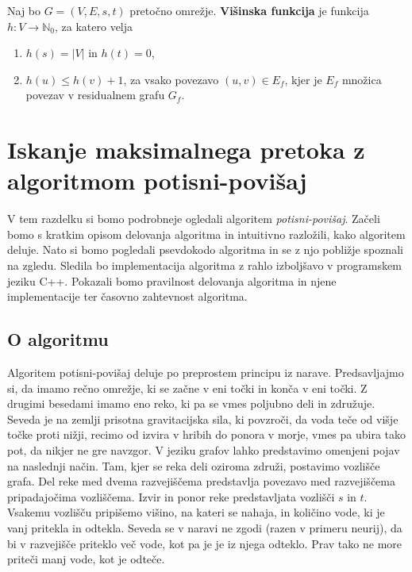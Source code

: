\documentclass[mat1]{fmfdelo}
\newcommand{\N}{\mathbb N}
\begin{document}
\begin{definicija}\label{def:visinska_funkcija}
Naj bo $G=(V,E,s,t)$ pretočno omrežje. \textbf{Višinska funkcija} je funkcija $h\colon V \rightarrow \N_0$, za katero velja
\begin{enumerate}
\item $h(s) = |V|$ in $h(t) = 0$,
\item $h(u) \leq h(v) + 1$, za vsako povezavo $(u,v) \in E_f$, kjer je $E_f$ množica povezav v residualnem grafu $G_f$.
\end{enumerate}
\end{definicija}








\section{Iskanje maksimalnega pretoka z algoritmom potisni-povišaj}

V tem razdelku si bomo podrobneje ogledali algoritem \textit{potisni-povišaj}. Začeli bomo s kratkim opisom delovanja algoritma in intuitivno razložili, kako algoritem deluje. Nato si bomo pogledali psevdokodo algoritma in se z njo pobližje spoznali na zgledu. Sledila bo implementacija algoritma z rahlo izboljšavo v programskem jeziku C++. Pokazali bomo pravilnost delovanja algoritma in njene implementacije ter časovno zahtevnost algoritma.

\subsection{O algoritmu}
Algoritem potisni-povišaj deluje po preprostem principu iz narave. Predsavljajmo si, da imamo rečno omrežje, ki se začne v eni točki in konča v eni točki. Z drugimi besedami imamo eno reko, ki pa se vmes poljubno deli in združuje. Seveda je na zemlji prisotna gravitacijska sila, ki povzroči, da voda teče od višje točke proti nižji, recimo od izvira v hribih do ponora v morje, vmes pa ubira tako pot, da nikjer ne gre navzgor. V jeziku grafov lahko predstavimo omenjeni pojav na naslednji način. Tam, kjer se reka deli oziroma združi, postavimo vozlišče grafa. Del reke med dvema razvejiščema predstavlja povezavo med razvejiščema pripadajočima vozliščema. Izvir in ponor reke predstavljata vozlišči $s$ in $t$. Vsakemu vozlišču pripišemo višino, na kateri se nahaja, in količino vode, ki je vanj pritekla in odtekla. Seveda se v naravi ne zgodi (razen v primeru neurij), da bi v razvejišče priteklo več vode, kot pa je je iz njega odteklo. Prav tako ne more priteči manj vode, kot je odteče.
\end{document}
